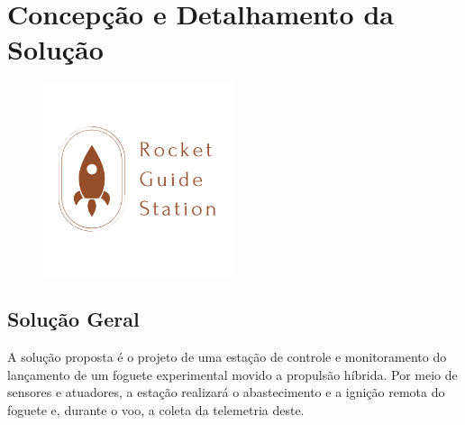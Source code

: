 \chapter{Concepção e Detalhamento da Solução}

\begin{figure}[H]
    \centering
    \includegraphics[width=0.5\textwidth]{figuras/rgs_35.png}
\end{figure}

\section{Solução Geral}
\par A solução proposta é o projeto de uma estação de controle e monitoramento do lançamento de um foguete experimental movido a propulsão híbrida. Por meio de sensores e atuadores, a estação realizará o abastecimento e a ignição remota do foguete e, durante o voo, a coleta da telemetria deste.






